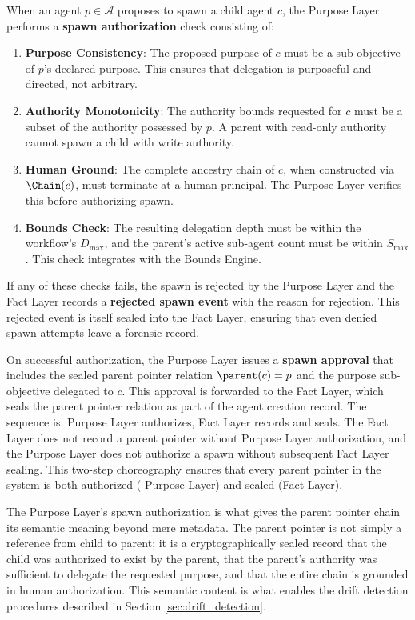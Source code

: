 \begin{definition}
\label{def:spawn_authorization}
When an agent $p \in \mathcal{A}$ proposes to spawn a child agent $c$, the Purpose Layer performs a \textbf{spawn authorization} check consisting of:
\begin{enumerate}
    \item \textbf{Purpose Consistency}: The proposed purpose of $c$ must be a sub-objective of $p$'s declared purpose. This ensures that delegation is purposeful and directed, not arbitrary.
    \item \textbf{Authority Monotonicity}: The authority bounds requested for $c$ must be a subset of the authority possessed by $p$. A parent with read-only authority cannot spawn a child with write authority.
    \item \textbf{Human Ground}: The complete ancestry chain of $c$, when constructed via $\Chain(c)$, must terminate at a human principal. The Purpose Layer verifies this before authorizing spawn.
    \item \textbf{Bounds Check}: The resulting delegation depth must be within the workflow's $D_{\max}$, and the parent's active sub-agent count must be within $S_{\max}$. This check integrates with the Bounds Engine.
\end{enumerate}
\end{definition}

If any of these checks fails, the spawn is rejected by the Purpose Layer and the Fact Layer records a \textbf{rejected spawn event} with the reason for rejection. This rejected event is itself sealed into the Fact Layer, ensuring that even denied spawn attempts leave a forensic record.

On successful authorization, the Purpose Layer issues a \textbf{spawn approval} that includes the sealed parent pointer relation $\parent(c) = p$ and the purpose sub-objective delegated to $c$. This approval is forwarded to the Fact Layer, which seals the parent pointer relation as part of the agent creation record. The sequence is: Purpose Layer authorizes, Fact Layer records and seals. The Fact Layer does not record a parent pointer without Purpose Layer authorization, and the Purpose Layer does not authorize a spawn without subsequent Fact Layer sealing. This two-step choreography ensures that every parent pointer in the system is both authorized ( Purpose Layer) and sealed (Fact Layer).

The Purpose Layer's spawn authorization is what gives the parent pointer chain its semantic meaning beyond mere metadata. The parent pointer is not simply a reference from child to parent; it is a cryptographically sealed record that the child was authorized to exist by the parent, that the parent's authority was sufficient to delegate the requested purpose, and that the entire chain is grounded in human authorization. This semantic content is what enables the drift detection procedures described in Section \ref{sec:drift_detection}.

